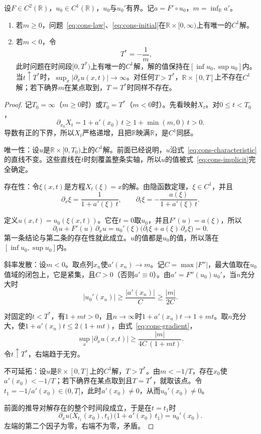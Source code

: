 \begin{theorem}[光滑解的寿命]
\label{thm:cons-lifespan}
设$F\in C^2(\mathbb{R})$，$u_0\in C^1(\mathbb{R})$，$u_0$与$u_0'$有界。记$a=F'\circ u_0$，$m=\inf_{\mathbb{R}}a'$。
\begin{enumerate}
  \item 若$m\geq0$，问题~\eqref{eq:cons-law}、\eqref{eq:cons-initial}在$\mathbb{R}\times[0,\infty)$上有唯一的$C^1$解。
  \item 若$m<0$，令
  \begin{equation}
    T^{*}=-\frac{1}{m},
    \label{eq:cons-breaking-time}
  \end{equation}
  此时问题在时间段$[0,T^{*})$上有唯一的$C^1$解，解的值保持在$[\inf u_0,\sup u_0]$内。当$t\uparrow T^{*}$时，$\sup_x\lvert\partial_xu(x,t)\rvert\to\infty$。对任何$T>T^{*}$，$\mathbb{R}\times[0,T]$上不存在$C^1$解；若下确界$m$在某点取到，$T=T^{*}$时同样不存在。
\end{enumerate}
\end{theorem}

\begin{proof}
记$T_0=\infty$（$m\geq0$时）或$T_0=T^{*}$（$m<0$时）。先看映射$X_t$。对$0\leq t<T_0$，
\[
  \partial_{x_0}X_t=1+a'(x_0)\,t\geq1+\min(m,0)\,t>0 .
\]
导数有正的下界，所以$X_t$严格递增，且把$\mathbb{R}$映满$\mathbb{R}$，是$C^1$同胚。

唯一性：设$u$是$\mathbb{R}\times[0,T_0)$上的$C^1$解。前面已经说明，$u$沿式~\eqref{eq:cons-characteristic}的直线不变。这些直线在$t$时刻覆盖整条实轴，所以$u$的值被式~\eqref{eq:cons-implicit}完全确定。

存在性：令$\xi(x,t)$是方程$X_t(\xi)=x$的解。由隐函数定理，$\xi\in C^1$，并且
\[
  \partial_x\xi=\frac{1}{1+a'(\xi)\,t},\qquad
  \partial_t\xi=-\frac{a(\xi)}{1+a'(\xi)\,t}.
\]

定义$u(x,t)=u_0(\xi(x,t))$。它在$t=0$取$u_0$，并且$F'(u)=a(\xi)$，所以
\[
  \partial_tu+F'(u)\,\partial_xu
  =u_0'(\xi)\bigl(\partial_t\xi+a(\xi)\,\partial_x\xi\bigr)=0 .
\]
第一条结论与第二条的存在性就此成立。$u$的值都是$u_0$的值，所以落在$[\inf u_0,\sup u_0]$内。

斜率发散：设$m<0$。取点列$x_n$使$a'(x_n)\to m$。记$C=\max\lvert F''\rvert$，最大值取在$u_0$值域的闭包上，它是紧集，且$C>0$（否则$a'\equiv0$）。由$a'=F''(u_0)u_0'$，当$n$充分大时
\[
  \lvert u_0'(x_n)\rvert\geq\frac{\lvert a'(x_n)\rvert}{C}\geq\frac{\lvert m\rvert}{2C}.
\]

对固定的$t<T^{*}$，有$1+mt>0$，且$n\to\infty$时$1+a'(x_n)t\to1+mt$。取$n$充分大，使$1+a'(x_n)t\leq2(1+mt)$，由式~\eqref{eq:cons-gradient}，
\[
  \sup_x\lvert\partial_xu(x,t)\rvert\geq\frac{\lvert m\rvert}{4C\,(1+mt)}.
\]
令$t\uparrow T^{*}$，右端趋于无穷。

不可延拓：设$u$是$\mathbb{R}\times[0,T]$上的$C^1$解，$T>T^{*}$。由$m<-1/T$，存在$x_0$使$a'(x_0)<-1/T$；若下确界在某点取到且$T=T^{*}$，就取该点。令$t_1=-1/a'(x_0)\in(0,T]$，此时$a'(x_0)\neq0$，从而$u_0'(x_0)\neq0$。

前面的推导对解存在的整个时间段成立，于是在$t=t_1$时
\[
  \partial_xu\bigl(X_{t_1}(x_0),t_1\bigr)\,\bigl(1+a'(x_0)\,t_1\bigr)=u_0'(x_0).
\]
左端的第二个因子为零，右端不为零，矛盾。
\end{proof}

